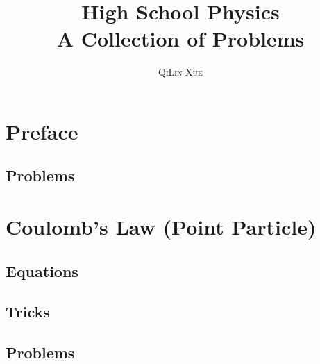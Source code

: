 \documentclass[a4paper,11pt,oneside]{book}
\title{\Huge \textbf{High School Physics} \\ \huge A Collection of Problems}
\author{\textsc{QiLin Xue}}
\begin{document}
\maketitle
\tableofcontents


\chapter*{Preface}


% 

% 

% 

\newpage
\section{Problems}


\chapter{Coulomb's Law (Point Particle)}


\section{Equations}


\section{Tricks}


\newpage
\section{Problems}

\end{document}
